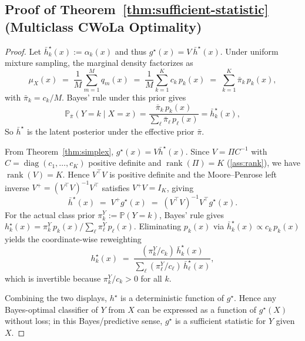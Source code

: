 \documentclass{article}
\theoremstyle{plain}
\theoremstyle{definition}
\theoremstyle{remark}
\newcommand{\Pp}{\mathbb{P}}
\DeclareMathOperator{\rank}{rank}
\DeclareMathOperator{\diag}{diag}
\newcommand{\asmp}[1]{\ref{#1}} %
\begin{document}
\subsection{Proof of Theorem~\ref{thm:sufficient-statistic} (Multiclass CWoLa Optimality)}
\label{app:proofs:sufficient}

\begin{proof} 
Let $\bar h^\star_k(x) := \alpha_k(x)$ and thus $g^\star(x)=V~\bar h^\star(x)$. Under uniform mixture sampling, the marginal density factorizes as
\begin{equation}
\mu_X(x) \;=\; \frac{1}{M}\sum_{m=1}^M q_m(x) \;=\; \frac{1}{M}\sum_{k=1}^K c_k\, p_k(x) \;=\; \sum_{k=1}^K \bar\pi_k\, p_k(x),
\end{equation}
with $\bar\pi_k = c_k/M$. Bayes' rule under this prior gives
\begin{equation}
    \Pp_{\bar\pi}(Y=k \mid X=x) = \frac{\bar\pi_k\, p_k(x)}{\sum_\ell \bar\pi_\ell\, p_\ell(x)} = \bar h^\star_k(x),    
\end{equation}
So $\bar h^\star$ is the latent posterior under the effective prior $\bar\pi$.

From Theorem~\ref{thm:simplex}, $g^\star(x) = V\bar h^\star(x)$. Since $V = \Pi C^{-1}$ with $C = \diag(c_1,\dots,c_K)$ positive definite and $\rank(\Pi) = K$ (\asmp{ass:rank}), we have $\rank(V) = K$. Hence $V^\top V$ is positive definite and the Moore--Penrose left inverse $V^+ = (V^\top V)^{-1} V^\top$ satisfies $V^+ V = I_K$, giving
\begin{equation}
\bar h^\star(x) \;=\; V^+ g^\star(x) \;=\; (V^\top V)^{-1} V^\top g^\star(x).
\end{equation}
For the actual class prior $\pi^Y_k := \Pp(Y=k)$, Bayes' rule gives $h^\star_k(x) = \pi^Y_k\, p_k(x) / \sum_\ell \pi^Y_\ell\, p_\ell(x)$. Eliminating $p_k(x)$ via $\bar h^\star_k(x) \propto c_k\, p_k(x)$ yields the coordinate-wise reweighting
\begin{equation}
h^\star_k(x) \;=\; \frac{(\pi^Y_k/c_k)\, \bar h^\star_k(x)}{\sum_\ell (\pi^Y_\ell/c_\ell)\, \bar h^\star_\ell(x)},
\end{equation}
which is invertible because $\pi^Y_k/c_k > 0$ for all $k$.

Combining the two displays, $h^\star$ is a deterministic function of $g^\star$. Hence any Bayes-optimal classifier of $Y$ from $X$ can be expressed as a function of $g^\star(X)$ without loss; in this Bayes/predictive sense, $g^\star$ is a sufficient statistic for $Y$ given $X$.
\end{proof}
\end{document}
